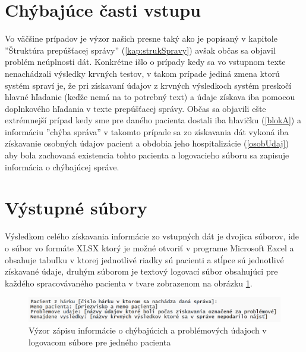 \section{Chýbajúce časti vstupu}
\label{chybCast}
Vo väčšine prípadov je výzor našich presne taký ako je popísaný v kapitole ''Štruktúra prepúšťacej správy'' (\ref{kap:strukSpravy}) avšak občas sa objavil problém neúplnosti dát. Konkrétne išlo o prípady kedy sa vo vstupnom texte nenachádzali výsledky krvných testov, v takom prípade jediná zmena ktorú systém spraví je, že pri získavaní údajov z krvných výsledkoch systém preskočí hlavné hľadanie (keďže nemá na to potrebný text) a údaje získava iba pomocou doplnkového hľadania v texte prepúšťacej správy. Občas sa objavili ešte extrémnejší prípad kedy sme pre daného pacienta dostali iba hlavičku (\ref{blokA}) a informáciu ''chýba správa'' v takomto prípade sa zo získavania dát vykoná iba získavanie osobných údajov pacient a obdobia jeho hospitalizácie (\ref{osobUdaj}) aby bola zachovaná existencia tohto pacienta a logovacieho súboru sa zapisuje informácia o chýbajúcej správe.

\section{Výstupné súbory}   

Výsledkom celého získavania informácie zo vstupných dát je dvojica súborov, ide o súbor vo formáte XLSX ktorý je možné otvoriť v programe Microsoft Excel a obsahuje tabuľku v ktorej jednotlivé riadky sú pacienti a stĺpce sú jednotlivé získavané údaje, druhým súborom je textový logovací súbor obsahujúci pre každého spracovávaného pacienta v tvare zobrazenom na obrázku \ref{obr:log}.

\begin{figure}
	\centerline{\includegraphics[width=1\textwidth]{images/log_subor}}
	\caption[Logovací súbor]{Výzor zápisu informácie o chýbajúcich a problémových údajoch v logovacom súbore pre jedného pacienta}
	\label{obr:log}
\end{figure}    
